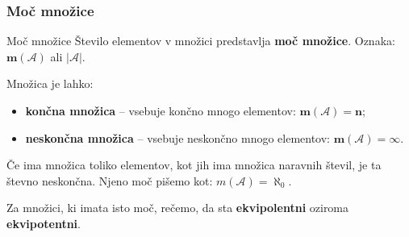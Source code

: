         \begin{frame}
            \frametitle{Moč množice}

            \begin{alertblock}{Moč množice}
                Število elementov v množici predstavlja \textbf{moč množice}. 
                Oznaka: $\mathbf{m(\mathcal{A})}$ ali $\mathbf{|\mathcal{A}|}$.
            \end{alertblock}

            \begin{alertblock}{}
                Množica je lahko:
                \begin{itemize}
                    \item \textbf{končna množica} -- vsebuje končno mnogo elementov: $\mathbf{m(\mathcal{A})=n}$;
                    \item \textbf{neskončna množica} -- vsebuje neskončno mnogo elementov: $\mathbf{m(\mathcal{A})=\infty}$.
                \end{itemize}
            \end{alertblock}

            \begin{block}{}
                Če ima množica toliko elementov, kot jih ima množica naravnih števil, je ta števno neskončna.
                Njeno moč pišemo kot: $m(\mathcal{A})=\aleph_0$. 
            \end{block}

            \begin{alertblock}{}
                Za množici, ki imata isto moč, rečemo, da sta \textbf{ekvipolentni} oziroma \textbf{ekvipotentni}.
            \end{alertblock}

        \end{frame}

        \begin{frame}
            
        \end{frame}